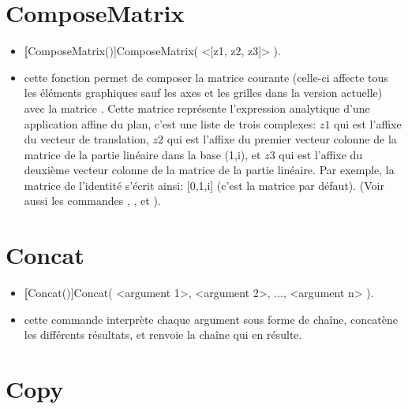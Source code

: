 \section{ComposeMatrix}\label{cmdComposeMatrix}

\begin{itemize}
 \item \util \textbf[ComposeMatrix()]{ComposeMatrix( <[z1, z2, z3]> )}.
 \item \desc cette fonction permet de composer la matrice courante (celle-ci affecte tous les éléments graphiques sauf les axes et les grilles dans la version actuelle) avec la matrice \argu{[z1, z2, z3]}. Cette matrice représente l'expression analytique d'une application affine du plan, c'est une liste de trois complexes: $z1$ qui est l'affixe du vecteur de translation, $z2$ qui est l'affixe du premier vecteur colonne de la matrice de la partie linéaire dans la base (1,i), et $z3$ qui est l'affixe du deuxième vecteur colonne de la matrice de la partie linéaire. Par exemple, la matrice de l'identité s'écrit ainsi: [0,1,i] (c'est la matrice par défaut). (Voir aussi les commandes , , et ).
\end{itemize}

\section{Concat}\label{cmdConcat}
\begin{itemize}
 \item \util \textbf[Concat()]{Concat( <argument 1>, <argument 2>, ..., <argument n> )}.
 \item \desc cette commande interprète chaque argument sous forme de chaîne, concatène les différents résultats, et renvoie la chaîne qui en résulte.
\end{itemize}

\section{Copy}\label{cmdCopy}

